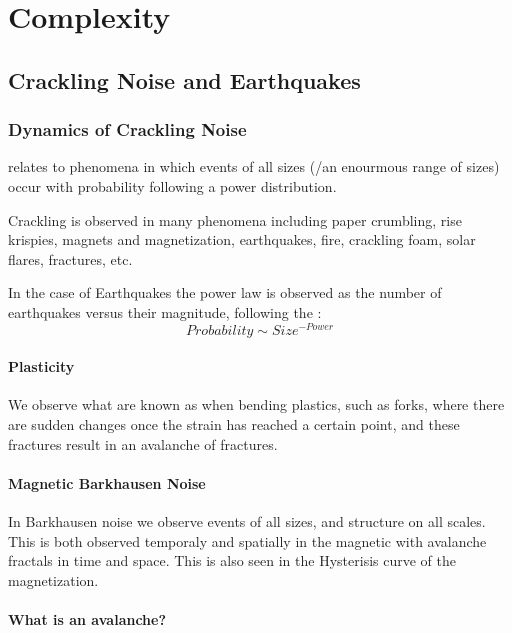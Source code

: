 \documentclass[12pt, a4paper, oneside, openright, titlepage]{book}
\begin{document}
\part{Complexity}


\chapter{Crackling Noise and Earthquakes}

\section{Dynamics of Crackling Noise}

\begin{defn}
     relates to phenomena in which events of all sizes (/an enourmous range of sizes) occur with probability following a power distribution.
\end{defn}

Crackling is observed in many phenomena including paper crumbling, rise krispies, magnets and magnetization, earthquakes, fire, crackling foam, solar flares, fractures, etc.

In the case of Earthquakes the power law is observed as the number of earthquakes versus their magnitude, following the : $$Probability\sim Size^{-Power}$$

\subsection{Plasticity}

We observe what are known as  when bending plastics, such as forks, where there are sudden changes once the strain has reached a certain point, and these fractures result in an avalanche of fractures.

\subsection{Magnetic Barkhausen Noise}

In Barkhausen noise we observe events of all sizes, and structure on all scales. This is both observed temporaly and spatially in the magnetic with avalanche fractals in time and space. This is also seen in the Hysterisis curve of the magnetization.

\subsection{What is an avalanche?}
\end{document}
